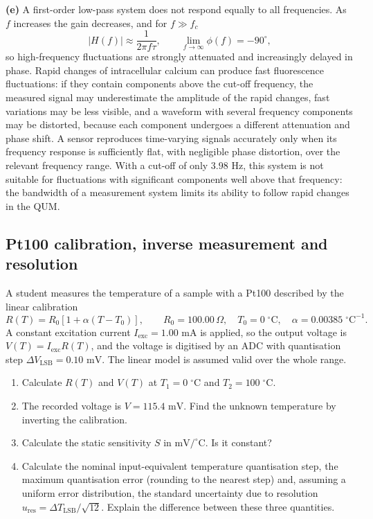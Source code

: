 \textbf{(e)} A first-order low-pass system does not respond equally to all frequencies. As $f$ increases the gain decreases, and for $f \gg f_c$
\begin{equation*}
|H(f)| \approx \frac{1}{2\pi f\tau}, \qquad \lim_{f \to \infty}\phi(f) = -90^\circ,
\end{equation*}
so high-frequency fluctuations are strongly attenuated and increasingly delayed in phase. Rapid changes of intracellular calcium can produce fast fluorescence fluctuations: if they contain components above the cut-off frequency, the measured signal may underestimate the amplitude of the rapid changes, fast variations may be less visible, and a waveform with several frequency components may be distorted, because each component undergoes a different attenuation and phase shift. A sensor reproduces time-varying signals accurately only when its frequency response is sufficiently flat, with negligible phase distortion, over the relevant frequency range. With a cut-off of only $3.98\text{ Hz}$, this system is not suitable for fluctuations with significant components well above that frequency: the bandwidth of a measurement system limits its ability to follow rapid changes in the QUM.

\subsection{Pt100 calibration, inverse measurement and resolution}
\label{ex:pt100_calibration}

A student measures the temperature of a sample with a Pt100 described by the linear calibration
\begin{equation*}
R(T) = R_0\left[1 + \alpha(T - T_0)\right], \qquad R_0 = 100.00\,\Omega, \quad T_0 = 0\;^\circ\text{C}, \quad \alpha = 0.00385\;^\circ\text{C}^{-1}.
\end{equation*}
A constant excitation current $I_{\text{exc}} = 1.00\text{ mA}$ is applied, so the output voltage is $V(T) = I_{\text{exc}}R(T)$, and the voltage is digitised by an ADC with quantisation step $\Delta V_{\text{LSB}} = 0.10\text{ mV}$. The linear model is assumed valid over the whole range.
\begin{enumerate}[label=(\alph*)]
    \item Calculate $R(T)$ and $V(T)$ at $T_1 = 0\;^\circ\text{C}$ and $T_2 = 100\;^\circ\text{C}$.
    \item The recorded voltage is $V = 115.4\text{ mV}$. Find the unknown temperature by inverting the calibration.
    \item Calculate the static sensitivity $S$ in $\text{mV}/^\circ\text{C}$. Is it constant?
    \item Calculate the nominal input-equivalent temperature quantisation step, the maximum quantisation error (rounding to the nearest step) and, assuming a uniform error distribution, the standard uncertainty due to resolution $u_{\text{res}} = \Delta T_{\text{LSB}}/\sqrt{12}$. Explain the difference between these three quantities.
\end{enumerate}


